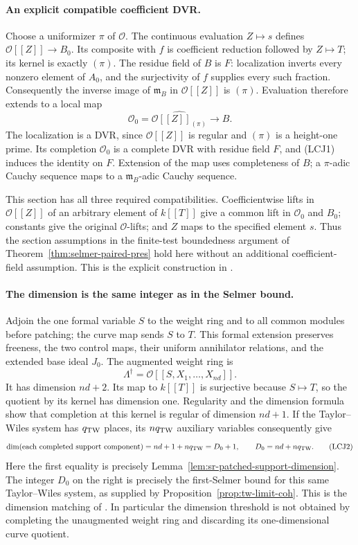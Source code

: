\paragraph{An explicit compatible coefficient DVR.}
Choose a uniformizer \(\pi\) of \(\mathcal O\).
The continuous evaluation \(Z\mapsto s\) defines
\(\mathcal O[[Z]]\to B_0\).
Its composite with \(f\) is coefficient reduction followed by
\(Z\mapsto T\); its kernel is exactly \((\pi)\).
The residue field of \(B\) is \(F\):
localization inverts every nonzero element of \(A_0\), and the
surjectivity of \(f\) supplies every such fraction.
Consequently the inverse image of \(\mathfrak m_B\) in
\(\mathcal O[[Z]]\) is \((\pi)\).
Evaluation therefore extends to a local map
\[
 \mathcal O_0=
    \widehat{\mathcal O[[Z]]_{(\pi)}}\longrightarrow B .
 \tag{LCJ1}
\]
The localization is a DVR, since \(\mathcal O[[Z]]\) is regular
and \((\pi)\) is a height-one prime.
Its completion \(\mathcal O_0\) is a complete DVR with residue
field \(F\), and (LCJ1) induces the identity on \(F\).
Extension of the map uses completeness of \(B\);
a \(\pi\)-adic Cauchy sequence maps to a
\(\mathfrak m_B\)-adic Cauchy sequence.

This section has all three required compatibilities.
Coefficientwise lifts in \(\mathcal O[[Z]]\) of an arbitrary
element of \(k[[T]]\) give a common lift in \(\mathcal O_0\) and
\(B_0\); constants give the original \(\mathcal O\)-lifts;
and \(Z\) maps to the specified element \(s\).
Thus the section assumptions in the finite-test boundedness
argument of Theorem~\ref{thm:selmer-paired-pres} hold here
without an additional coefficient-field assumption.
This is the explicit construction in
.

\paragraph{The dimension is the same integer as in the Selmer bound.}
Adjoin the one formal variable \(S\) to the weight ring and to
all common modules before patching; the curve map sends \(S\)
to \(T\).
This formal extension preserves freeness, the two control
maps, their uniform annihilator relations, and the extended
base ideal \(J_0\).
The augmented weight ring is
\[
 \Lambda^\dagger=\mathcal O[[S,X_1,\ldots,X_{nd}]] .
\]
It has dimension \(nd+2\).
Its map to \(k[[T]]\) is surjective because \(S\mapsto T\),
so the quotient by its kernel has dimension one.
Regularity and the dimension formula show that completion at
this kernel is regular of dimension \(nd+1\).
If the Taylor--Wiles system has \(q_{\rm TW}\) places, its
\(nq_{\rm TW}\) auxiliary variables consequently give
\[
 \dim(\text{each completed support component})
      =nd+1+nq_{\rm TW}=D_0+1,\qquad
 D_0=nd+nq_{\rm TW}.
 \tag{LCJ2}
\]
Here the first equality is precisely
Lemma~\ref{lem:sr-patched-support-dimension}.
The integer \(D_0\) on the right is precisely the first-Selmer
bound for this same Taylor--Wiles system, as supplied by
Proposition~\ref{prop:tw-limit-coh}.
This is the dimension matching of
.
In particular the dimension threshold is not obtained by
completing the unaugmented weight ring and discarding its
one-dimensional curve quotient.

